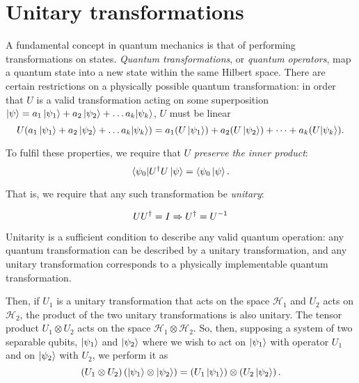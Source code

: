 \section{Unitary transformations}\label{sec:unitary}
A fundamental concept in quantum mechanics is that of performing transformations on states. 
\emph{Quantum transformations}, or \emph{quantum operators}, map a quantum state into a new state within the same Hilbert space. 
There are certain restrictions on a physically possible quantum transformation: in order that $U$ is a valid transformation acting on some superposition $\ket{\psi} = a_1\ket{\psi_1} + a_2 \ket{\psi_2} + \dots a_k|\psi_k\rangle $, $U$ must be linear 
\begin{equation}
    U (  a_1\ket{\psi_1} + a_2 \ket{\psi_2} + \dots a_k|\psi_k\rangle ) =  a_1 (U\ket{\psi_1}) + a_2 (U\ket{\psi_2}) + \dots + a_k (U|\psi_k\rangle).
\end{equation}


To fulfil these properties, we require that $U$ \emph{preserve the inner product}:
$$ \langle \psi_0 | U^{\dag}U \ket{\psi} = \langle \psi_0 \ket{\psi}. $$

That is, we require that any such transformation be \emph{unitary}:

\begin{equation}  
    \label{unitary condition}
    UU^{\dag} = I \\
    \Rightarrow U^{\dag} = U^{-1}
\end{equation}

Unitarity is a sufficient condition to describe any valid quantum operation: any quantum transformation can be described by a unitary transformation, 
    and any unitary transformation corresponds to a physically implementable quantum transformation. %

Then, if $U_1$ is a unitary transformation that acts on the space $\mathcal{H}_1$ and $U_2$ acts on $\mathcal{H}_2$, the product of the two unitary transformations is also unitary. 
The tensor product $U_1 \otimes U_2$ acts on the space $\mathcal{H}_1 \otimes \mathcal{H}_2$. 
So, then, supposing a system of two separable qubits, $\ket{\psi_1} $ and $\ket{\psi_2} $ where we wish to act on $\ket{\psi_1} $ with operator $U_1$ and on $\ket{\psi_2} $ with $U_2$, 
    we perform it as
\begin{equation}
    \left( U_1 \otimes U_2 \right) \left(\ket{\psi_1} \otimes \ket{\psi_2} \right) = \left(U_1\ket{\psi_1}\right) \otimes \left(U_2 \ket{\psi_2}\right).
\end{equation}

